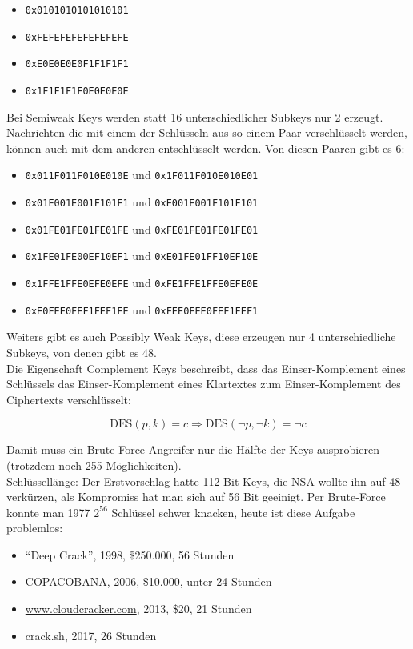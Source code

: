 \begin{itemize}
    \item \verb|0x0101010101010101|
    \item \verb|0xFEFEFEFEFEFEFEFE|
    \item \verb|0xE0E0E0E0F1F1F1F1|
    \item \verb|0x1F1F1F1F0E0E0E0E|
\end{itemize}

Bei Semiweak Keys  werden statt 16 unterschiedlicher Subkeys nur 2 erzeugt. Nachrichten die mit einem der Schlüsseln aus so einem Paar verschlüsselt 
werden, können auch mit dem anderen entschlüsselt werden. Von diesen Paaren gibt es 6:

\begin{itemize}
    \item \verb|0x011F011F010E010E| und \verb|0x1F011F010E010E01|
    \item \verb|0x01E001E001F101F1| und \verb|0xE001E001F101F101|
    \item \verb|0x01FE01FE01FE01FE| und \verb|0xFE01FE01FE01FE01|
    \item \verb|0x1FE01FE00EF10EF1| und \verb|0xE01FE01FF10EF10E|
    \item \verb|0x1FFE1FFE0EFE0EFE| und \verb|0xFE1FFE1FFE0EFE0E|
    \item \verb|0xE0FEE0FEF1FEF1FE| und \verb|0xFEE0FEE0FEF1FEF1|
\end{itemize}

Weiters gibt es auch Possibly Weak Keys, diese erzeugen nur 4 unterschiedliche Subkeys, von denen gibt es 48.\\

Die Eigenschaft Complement Keys  beschreibt, dass das Einser-Komplement eines Schlüssels das Einser-Komplement eines Klartextes zum 
Einser-Komplement des Ciphertexts verschlüsselt: 

$$\text{DES}(p, k) = c \Rightarrow \text{DES}(\lnot p, \lnot k) = \lnot c$$

Damit muss ein Brute-Force Angreifer nur die Hälfte der Keys ausprobieren (trotzdem noch 255 Möglichkeiten).\\


Schlüssellänge: Der Erstvorschlag hatte 112 Bit Keys, die NSA wollte ihn auf 48 verkürzen, als Kompromiss hat man sich auf 56 Bit geeinigt.
Per Brute-Force konnte man 1977 $2^{56}$ Schlüssel schwer knacken, heute ist diese Aufgabe problemlos:

\begin{itemize}
    \item ``Deep Crack'', 1998, \$250.000, 56 Stunden
    \item COPACOBANA, 2006, \$10.000, unter 24 Stunden
    \item \url{www.cloudcracker.com}, 2013, \$20, 21 Stunden
    \item crack.sh, 2017, 26 Stunden
\end{itemize}

